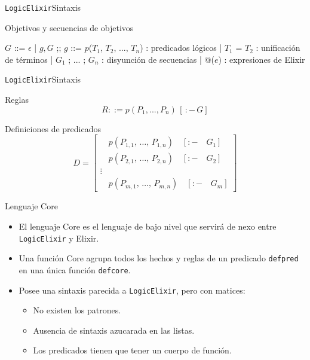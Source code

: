 \documentclass[14pt,aspectratio=169]{beamer}
\begin{document}
\begin{frame}{\texttt{LogicElixir}}{Sintaxis}
  \footnotesize \begin{block}{Objetivos y secuencias de objetivos}
    \begin{bnfgrammar}
      $G$ ::= $\epsilon$ | $g, G$
    ;;
      $g$ ::= $p$($T_1$, $T_2$, ..., $T_n$) : predicados lógicos
          | $T_1$ = $T_2$ : unificación de términos
          | $G_1$ ; ... ; $G_n$ : disyunción de secuencias
          | $@$($e$) : expresiones de Elixir
    \end{bnfgrammar}
  \end{block}
\end{frame}

\begin{frame}{\texttt{LogicElixir}}{Sintaxis}
  \begin{block}{Reglas}
    \begin{equation*}
      R ::= p(P_1, ..., P_n)\,[\,:-\, G]
    \end{equation*}
  \end{block}
  \begin{block}{Definiciones de predicados}
    \begin{equation*}
      D =
      \begin{bmatrix}
        \quad p(P_{1,1},\, \ldots,\, P_{1,n}) \quad [:- \quad G_1]\\
        \quad p(P_{2,1},\, \ldots,\, P_{2,n}) \quad [:- \quad G_2]\\
        \vdots \\
        \quad p(P_{m,1},\, \ldots,\, P_{m,n}) \quad [:- \quad G_m]
      \end{bmatrix}
    \end{equation*}
  \end{block}
\end{frame}

\begin{frame}{Lenguaje Core}
  \begin{itemize}
    \item El lenguaje Core es el lenguaje de bajo nivel que servirá de nexo
    entre \texttt{LogicElixir} y Elixir.
    \item Una función Core agrupa todos los hechos y reglas de un predicado
    \texttt{defpred} en una única función \texttt{defcore}.
    \item Posee una sintaxis parecida a \texttt{LogicElixir}, pero con matices:
    \begin{itemize}
      \item No existen los patrones.
      \item Ausencia de sintaxis azucarada en las listas.
      \item Los predicados tienen que tener un cuerpo de función.
    \end{itemize}
  \end{itemize}
\end{frame}
\end{document}
